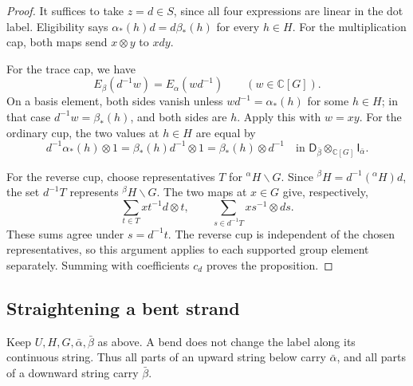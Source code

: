 \documentclass[11pt,a4paper]{article}
\numberwithin{equation}{section}
\theoremstyle{definition}
\newcommand{\C}{\mathbb C}
\newcommand{\cg}[2]{{}^{#1}\!#2}
\newcommand{\I}{\mathsf I}
\newcommand{\D}{\mathsf D}
\begin{document}
\begin{proof}
It suffices to take \(z=d\in S\), since all four expressions are
linear in the dot label. Eligibility says
\(\alpha_*(h)d=d\beta_*(h)\) for every \(h\in H\).
For the multiplication cap, both maps send
\(x\otimes y\) to \(xdy\).

For the trace cap, we have
\[
 E_\beta(d^{-1}w)=E_\alpha(wd^{-1})\qquad(w\in\C[G]).
\]
On a basis element, both sides vanish unless
\(wd^{-1}=\alpha_*(h)\) for some \(h\in H\); in that case
\(d^{-1}w=\beta_*(h)\), and both sides are \(h\).
Apply this with \(w=xy\).
For the ordinary cup, the two values at \(h\in H\) are equal by
\[
 d^{-1}\alpha_*(h)\otimes1
   =\beta_*(h)d^{-1}\otimes1
   =\beta_*(h)\otimes d^{-1}
 \quad\text{in }\D_{\bar\beta}\otimes_{\C[G]}\I_{\bar\alpha}.
\]

For the reverse cup, choose representatives \(T\) for
\(\cg{\alpha}{H}\backslash G\). Since
\(\cg{\beta}{H}=d^{-1}(\cg{\alpha}{H})d\), the set
\(d^{-1}T\) represents \(\cg{\beta}{H}\backslash G\).
The two maps at \(x\in G\) give, respectively,
\[
 \sum_{t\in T}xt^{-1}d\otimes t,
 \qquad
 \sum_{s\in d^{-1}T}xs^{-1}\otimes ds.
\]
These sums agree under \(s=d^{-1}t\).
The reverse cup is independent of the chosen representatives, so
this argument applies to each supported group element separately.
Summing with coefficients \(c_d\) proves the proposition.
\end{proof}

\subsection{Straightening a bent strand}\label{sec:cup-cap-straightening}

Keep \(U,H,G,\bar\alpha,\bar\beta\) as above. A bend does not change
the label along its continuous string. Thus all parts of an upward
string below carry \(\bar\alpha\), and all parts of a downward
string carry \(\bar\beta\).
\end{document}
